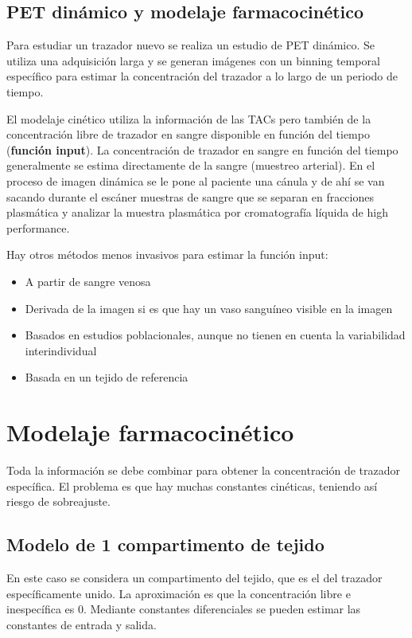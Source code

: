 \subsection{PET dinámico y modelaje farmacocinético}
Para estudiar un trazador nuevo se realiza un estudio de PET dinámico. Se utiliza una adquisición larga y se generan imágenes con un binning temporal específico para estimar la concentración del trazador a lo largo de un periodo de tiempo.

El modelaje cinético utiliza la información de las TACs pero también de la concentración libre de trazador en sangre disponible en función del tiempo (\textbf{función input}). La concentración de trazador en sangre en función del tiempo generalmente se estima directamente de la sangre (muestreo arterial). En el proceso de imagen dinámica se le pone al paciente una cánula y de ahí se van sacando durante el escáner muestras de sangre que se separan en fracciones plasmática y analizar la muestra plasmática por cromatografía líquida de high performance. 

Hay otros métodos menos invasivos para estimar la función input:
\begin{itemize}
\item A partir de sangre venosa
\item Derivada de la imagen si es que hay un vaso sanguíneo visible en la imagen
\item Basados en estudios poblacionales, aunque no tienen en cuenta la variabilidad interindividual 
\item Basada en un tejido de referencia
\end{itemize}

\section{Modelaje farmacocinético}
Toda la información se debe combinar para obtener la concentración de trazador específica. El problema es que hay muchas constantes cinéticas, teniendo así riesgo de sobreajuste. 

\subsection{Modelo de 1 compartimento de tejido}
En este caso se considera un compartimento del tejido, que es el del trazador específicamente unido.  La aproximación es que la concentración libre e inespecífica es 0. Mediante constantes diferenciales se pueden estimar las constantes de entrada y salida. 

